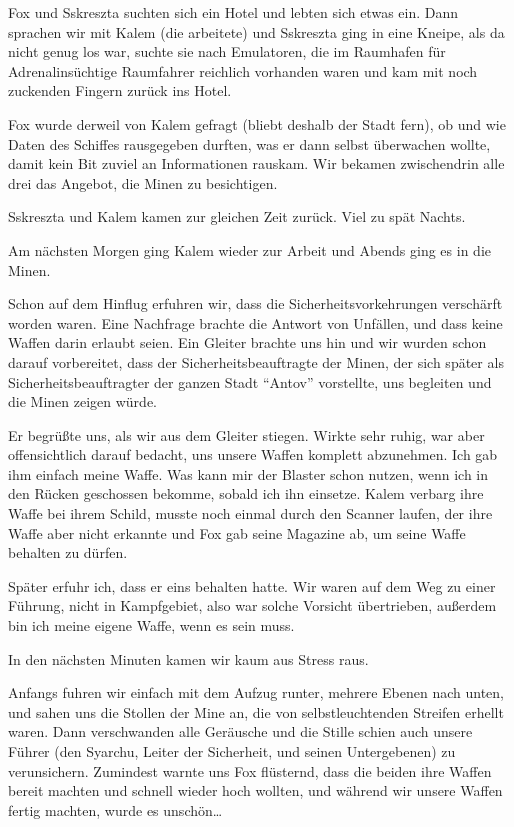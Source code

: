 \documentclass[11pt]{scrartcl}
\begin{document}
Fox und Sskreszta suchten sich ein Hotel und lebten sich etwas ein. Dann
sprachen wir mit Kalem (die arbeitete) und Sskreszta ging in eine
Kneipe, als da nicht genug los war, suchte sie nach Emulatoren, die im
Raumhafen für Adrenalinsüchtige Raumfahrer reichlich vorhanden waren und
kam mit noch zuckenden Fingern zurück ins Hotel.

Fox wurde derweil von Kalem gefragt (bliebt deshalb der Stadt fern), ob
und wie Daten des Schiffes rausgegeben durften, was er dann selbst
überwachen wollte, damit kein Bit zuviel an Informationen rauskam. Wir
bekamen zwischendrin alle drei das Angebot, die Minen zu besichtigen.

Sskreszta und Kalem kamen zur gleichen Zeit zurück. Viel zu spät Nachts.

Am nächsten Morgen ging Kalem wieder zur Arbeit und Abends ging es in
die Minen.

Schon auf dem Hinflug erfuhren wir, dass die Sicherheitsvorkehrungen
verschärft worden waren. Eine Nachfrage brachte die Antwort von
Unfällen, und dass keine Waffen darin erlaubt seien. Ein Gleiter brachte
uns hin und wir wurden schon darauf vorbereitet, dass der
Sicherheitsbeauftragte der Minen, der sich später als
Sicherheitsbeauftragter der ganzen Stadt ``Antov'' vorstellte, uns
begleiten und die Minen zeigen würde.

Er begrüßte uns, als wir aus dem Gleiter stiegen. Wirkte sehr ruhig, war
aber offensichtlich darauf bedacht, uns unsere Waffen komplett
abzunehmen. Ich gab ihm einfach meine Waffe. Was kann mir der Blaster
schon nutzen, wenn ich in den Rücken geschossen bekomme, sobald ich ihn
einsetze. Kalem verbarg ihre Waffe bei ihrem Schild, musste noch einmal
durch den Scanner laufen, der ihre Waffe aber nicht erkannte und Fox gab
seine Magazine ab, um seine Waffe behalten zu dürfen.

Später erfuhr ich, dass er eins behalten hatte. Wir waren auf dem Weg zu
einer Führung, nicht in Kampfgebiet, also war solche Vorsicht
übertrieben, außerdem bin ich meine eigene Waffe, wenn es sein muss.

In den nächsten Minuten kamen wir kaum aus Stress raus.

Anfangs fuhren wir einfach mit dem Aufzug runter, mehrere Ebenen nach
unten, und sahen uns die Stollen der Mine an, die von selbstleuchtenden
Streifen erhellt waren. Dann verschwanden alle Geräusche und die Stille
schien auch unsere Führer (den Syarchu, Leiter der Sicherheit, und
seinen Untergebenen) zu verunsichern. Zumindest warnte uns Fox
flüsternd, dass die beiden ihre Waffen bereit machten und schnell wieder
hoch wollten, und während wir unsere Waffen fertig machten, wurde es
unschön\ldots{}
\end{document}
